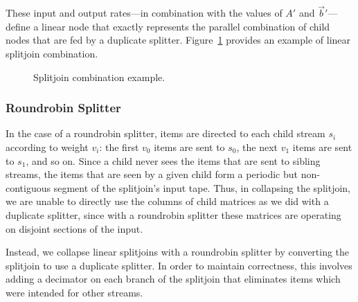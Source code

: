 {These input and output rates---in combination with the values of $A'$
and ${\vec b}'$---define a linear node that exactly represents the
parallel combination of child nodes that are fed by a duplicate
splitter. Figure~\ref{fig:example-splitjoin-combination} provides an
example of linear splitjoin combination.

\begin{figure}[t]
\center
\epsfxsize=2.8in
\caption{Splitjoin combination example.}
\protect\label{fig:example-splitjoin-combination}
\vspace{-12pt}
\end{figure}



\subsubsection{Roundrobin Splitter}

In the case of a roundrobin splitter, items are directed to each child
stream $s_i$ according to weight $v_i$: the first $v_0$ items are sent
to $s_0$, the next $v_1$ items are sent to $s_1$, and so on.  Since a
child never sees the items that are sent to sibling streams, the items
that are seen by a given child form a periodic but non-contiguous
segment of the splitjoin's input tape.  Thus, in collapsing the
splitjoin, we are unable to directly use the columns of child matrices
as we did with a duplicate splitter, since with a roundrobin splitter
these matrices are operating on disjoint sections of the input.

Instead, we collapse linear splitjoins with a roundrobin splitter by
converting the splitjoin to use a duplicate splitter.  In order to
maintain correctness, this involves adding a decimator on each branch
of the splitjoin that eliminates items which were intended for other
streams.

}
